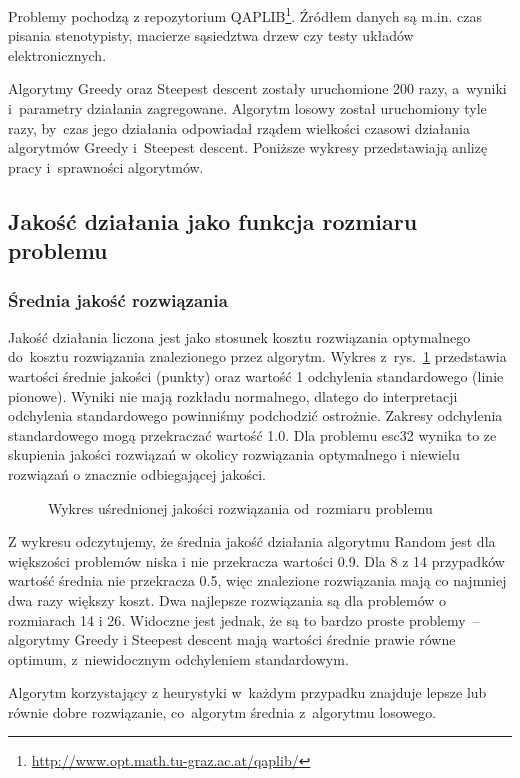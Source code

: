 \documentclass[a4paper,10pt]{article}
\begin{document}
Problemy pochodzą z repozytorium QAPLIB\footnote{\url{http://www.opt.math.tu-graz.ac.at/qaplib/}}.
Źródłem danych są m.in. czas pisania stenotypisty, macierze sąsiedztwa drzew czy testy układów elektronicznych.

Algorytmy Greedy oraz Steepest descent zostały uruchomione 200 razy, a~wyniki i~parametry działania zagregowane. 
Algorytm losowy został uruchomiony tyle razy, by~czas jego działania odpowiadał rządem wielkości czasowi działania algorytmów Greedy
i~Steepest descent.
Poniższe wykresy przedstawiają anlizę pracy i~sprawności algorytmów.
\subsection{Jakość działania jako funkcja rozmiaru problemu}
\subsubsection{Średnia jakość rozwiązania}
Jakość działania liczona jest jako stosunek kosztu rozwiązania optymalnego do~kosztu rozwiązania znalezionego przez
algorytm.
Wykres z~rys.~\ref{fig:qualityvssizemean} przedstawia wartości średnie jakości (punkty) oraz wartość 1 odchylenia standardowego (linie pionowe).
Wyniki nie mają rozkładu normalnego, dlatego do interpretacji odchylenia standardowego powinniśmy podchodzić ostrożnie.
Zakresy odchylenia standardowego mogą przekraczać wartość \num{1.0}.
Dla problemu esc32 wynika to ze skupienia jakości rozwiązań w okolicy rozwiązania optymalnego i niewielu rozwiązań o znacznie odbiegającej jakości.
\begin{figure}[h!]
\begin{center}

\caption{Wykres uśrednionej jakości rozwiązania od~rozmiaru problemu}
\label{fig:qualityvssizemean}
\end{center}
\end{figure}

Z wykresu odczytujemy, że średnia jakość działania algorytmu Random jest dla większości problemów niska i nie przekracza wartości \num{0.9}.  
Dla 8 z 14 przypadków wartość średnia nie przekracza \num{0.5}, więc znalezione rozwiązania mają co najmniej dwa razy większy koszt.
Dwa najlepsze rozwiązania są dla problemów o rozmiarach 14 i 26.
Widoczne jest jednak, że są to bardzo proste problemy~-- algorytmy Greedy i Steepest descent mają wartości średnie prawie równe optimum,
z~niewidocznym odchyleniem standardowym.

Algorytm korzystający z heurystyki w~każdym przypadku znajduje lepsze lub równie dobre rozwiązanie, co~algorytm średnia z~algorytmu losowego.
\end{document}
